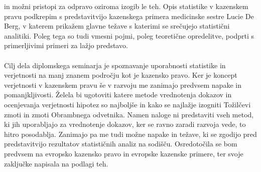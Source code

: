 \documentclass[fin1, tisk]{fmfdelo}
\theoremstyle{definition}
\theoremstyle{trditev}
\theoremstyle{izrek}
\begin{document}
in možni pristopi za odpravo oziroma izogib le teh. Opis statistike v kazenskem pravu podkrepim s predstavitvijo kazenskega primera medicinske 
sestre Lucie De Berg, v katerem prikažem glavne težave s katerimi se srečujejo statistični analitiki. Poleg tega so tudi vmesni pojmi, 
poleg teoretične opredelitve, podprti s primerljivimi primeri za lažjo predstavo.\\\\
Cilj dela diplomskega seminarja je spoznavanje uporabnosti statistike in verjetnosti na manj znanem področju kot je kazensko pravo. Ker je koncept 
verjetnosti v kazenskem pravu še v razvoju me zanimajo predvsem napake in pomanjkljivosti. Želela bi ugotoviti katere metode vrednotenja 
dokazov in ocenjevanja verjetnosti hipotez so najboljše in kako se najlažje izogniti Tožilčevi zmoti in zmoti Obrambnega odvetnika. Namen 
naloge ni predstaviti vseh metod, ki jih uporabljajo za vrednotenje dokazov, ker se ravno zaradi razvoja vede, to hitro posodablja. Zanimajo pa 
me tudi možne napake in težave, ki se zgodijo pred predstavitvijo rezultatov statističnih analiz na sodišču. Osredotočila se bom 
predvsem na evropsko kazensko pravo in evropske kazenske primere, ter svoje zaključke napisala na podlagi teh.

\end{document}
